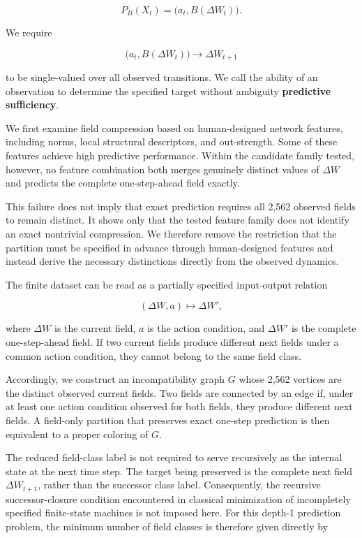 \documentclass[
  11pt,
]{article}
\begin{document}
\[{P_B(X_t)=\bigl(a_t,B(\Delta W_t)\bigr).}\]

We require

\[{\bigl(a_t,B(\Delta W_t)\bigr)\longrightarrow\Delta W_{t+1}}\]

to be single-valued over all observed transitions. We call the ability
of an observation to determine the specified target without ambiguity
\textbf{predictive sufficiency}.

We first examine field compression based on human-designed network
features, including norms, local structural descriptors, and
out-strength. Some of these features achieve high predictive
performance. Within the candidate family tested, however, no feature
combination both merges genuinely distinct values of \({\Delta W}\) and
predicts the complete one-step-ahead field exactly.

This failure does not imply that exact prediction requires all 2,562
observed fields to remain distinct. It shows only that the tested
feature family does not identify an exact nontrivial compression. We
therefore remove the restriction that the partition must be specified in
advance through human-designed features and instead derive the necessary
distinctions directly from the observed dynamics.

The finite dataset can be read as a partially specified input-output
relation

\[{(\Delta W,a)\longmapsto\Delta W',}\]

where \({\Delta W}\) is the current field, \({a}\) is the action
condition, and \({\Delta W'}\) is the complete one-step-ahead field. If
two current fields produce different next fields under a common action
condition, they cannot belong to the same field class.

Accordingly, we construct an incompatibility graph \({G}\) whose 2,562
vertices are the distinct observed current fields. Two fields are
connected by an edge if, under at least one action condition observed
for both fields, they produce different next fields. A field-only
partition that preserves exact one-step prediction is then equivalent to
a proper coloring of \({G}\).

The reduced field-class label is not required to serve recursively as
the internal state at the next time step. The target being preserved is
the complete next field \({\Delta W_{t+1}}\), rather than the successor
class label. Consequently, the recursive successor-closure condition
encountered in classical minimization of incompletely specified
finite-state machines is not imposed here. For this depth-1 prediction
problem, the minimum number of field classes is therefore given directly
by
\end{document}
